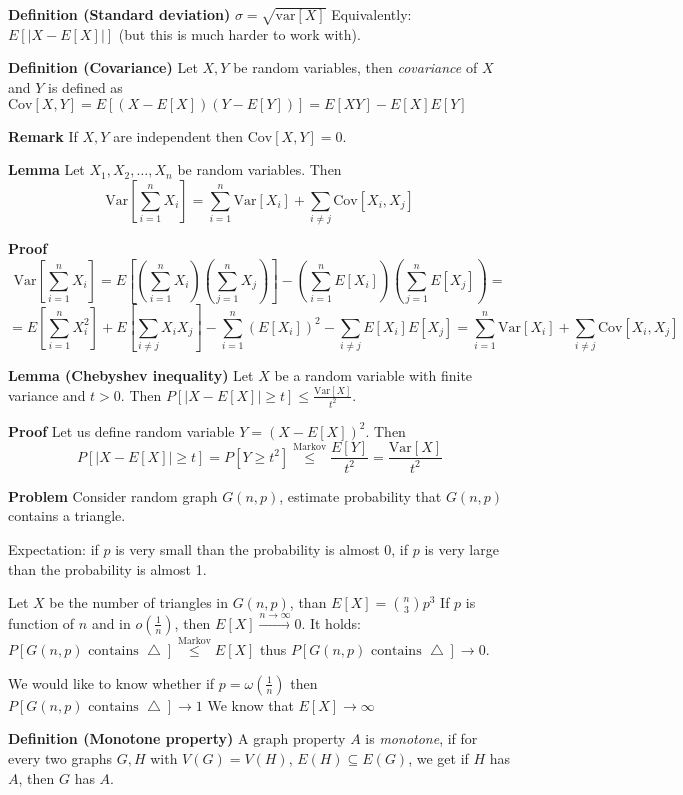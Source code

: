 \documentclass[a4paper]{article}
\begin{document}
\textbf{Definition (Standard deviation)}
$\sigma = \sqrt{\text{var}[X]}$
Equivalently: $E[|X - E[X]|]$ (but this is much harder to work with).

\textbf{Definition (Covariance)}
Let $X, Y$ be random variables, then \emph{covariance} of $X$ and $Y$ is defined as $\text{Cov}[X,Y] = E[(X - E[X])(Y - E[Y])] = E[XY] - E[X]E[Y]$

\textbf{Remark}
If $X, Y$ are independent then $\text{Cov}[X, Y] = 0$.

\textbf{Lemma}
Let $X_1, X_2, \ldots, X_n$ be random variables.
Then $$\text{Var}\left[\sum_{i=1}^n X_i\right] = \sum_{i=1}^n \text{Var}[X_i] + \sum_{i \neq j} \text{Cov}[X_i, X_j]$$

\textbf{Proof}
$$\text{Var}\left[\sum_{i=1}^n X_i\right] = E\left[\left(\sum_{i=1}^n X_i\right)\left(\sum_{j=1}^n X_j\right)\right] - \left(\sum_{i=1}^n E[X_i]\right)\left(\sum_{j=1}^n E[X_j]\right) =$$
$$= E\left[\sum_{i=1}^n X_i^2\right] + E \left[\sum_{i \neq j} X_i X_j\right] - \sum_{i=1}^n\left(E[X_i]\right)^2 - \sum_{i \neq j} E[X_i] E[X_j] =
\sum_{i=1}^n \text{Var}[X_i] + \sum_{i \neq j} \text{Cov}[X_i, X_j]$$

\textbf{Lemma (Chebyshev inequality)}
Let $X$ be a random variable with finite variance and $t > 0$.
Then $P[|X - E[X]| \geq t] \leq \frac{\text{Var}[X]}{t^2}$.

\textbf{Proof}
Let us define random variable $Y = (X - E[X])^2$.
Then $$P[|X - E[X]| \geq t] = P[Y \geq t^2] \stackrel{\text{Markov}}{\leq} \frac{E[Y]}{t^2} = \frac{\text{Var}[X]}{t^2}$$

\textbf{Problem}
Consider random graph $G(n, p)$, estimate probability that $G(n, p)$ contains a triangle.

Expectation: if $p$ is very small than the probability is almost 0, if $p$ is very large than the probability is almost 1.

Let $X$ be the number of triangles in $G(n,p)$, than $E[X] = {n \choose 3} p^3$
If $p$ is function of $n$ and in $o(\frac{1}{n})$, then $E[X] \stackrel{n \rightarrow \infty}{\rightarrow} 0$.
It holds: $P[G(n,p) \text{ contains } \bigtriangleup] \stackrel{\text{Markov}}{\leq} E[X]$ thus $P[G(n,p) \text{ contains } \bigtriangleup] \rightarrow 0$.

We would like to know whether if $p = \omega(\frac{1}{n})$ then $P[G(n,p) \text{ contains } \bigtriangleup] \rightarrow 1$
We know that $E[X] \rightarrow \infty$

\textbf{Definition (Monotone property)}
A graph property $A$ is \emph{monotone}, if for every two graphs $G, H$ with $V(G) = V(H)$, $E(H) \subseteq E(G)$, we get if $H$ has $A$, then $G$ has $A$.
\end{document}
